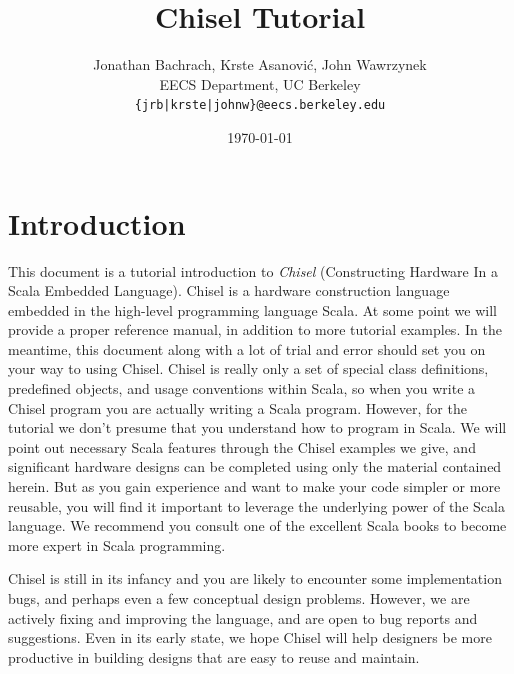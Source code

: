 \documentclass[10pt]{article}
\title{Chisel Tutorial}
\author{Jonathan Bachrach, Krste Asanovi\'{c}, John Wawrzynek \\
EECS Department, UC Berkeley\\
{\tt  \{jrb|krste|johnw\}@eecs.berkeley.edu}
}
\date{\today}
\begin{document}
\maketitle{}


\section{Introduction}

This document is a tutorial introduction to {\em Chisel} (Constructing
Hardware In a Scala Embedded Language).  Chisel is a hardware
construction language embedded in the high-level programming language
Scala.  At some point we will provide a proper reference manual, in
addition to more tutorial examples.  In the meantime, this document
along with a lot of trial and error should set you on your way to
using Chisel.  Chisel is really only a set of special class
definitions, predefined objects, and usage conventions within Scala,
so when you write a Chisel program you are actually writing a Scala
program.  However, for the tutorial we don't presume that you
understand how to program in Scala.  We will point out necessary Scala
features through the Chisel examples we give, and significant hardware
designs can be completed using only the material contained herein.
But as you gain experience and want to make your code simpler or more
reusable, you will find it important to leverage the underlying power
of the Scala language. We recommend you consult one of the excellent
Scala books to become more expert in Scala programming.

Chisel is still in its infancy and you are likely to encounter some
implementation bugs, and perhaps even a few conceptual design
problems.  However, we are actively fixing and improving the language,
and are open to bug reports and suggestions.  Even in its early state,
we hope Chisel will help designers be more productive in building
designs that are easy to reuse and maintain.
\end{document}
